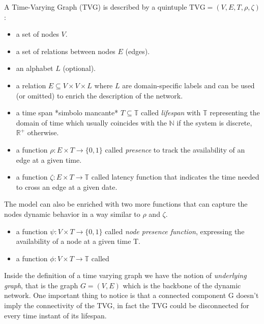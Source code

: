 	A Time-Varying Graph (TVG) is described by a quintuple \(\text{TVG} = (V, E, T, \rho, \zeta) \):
	\begin{itemize}
		\item a set of nodes \(V\).
		
		\item a set of relations between nodes \(E\) (edges).	
		
		\item an alphabet \(L\) (optional).
		
		\item a relation \(E \subseteq V \times V \times L\) where \(L\) are domain-specific labels and can be used (or omitted) to enrich the description of the network.
		
		\item a time span *simbolo mancante* \( T \subseteq \mathbb{T}\) called \textit{lifespan} with \(\mathbb{T}\) representing the domain of time which usually coincides with the \(\mathbb{N}\) if the system is discrete, \(\mathbb{R}^+\) otherwise.
		
		\item a function \(\rho : E \times T \to \{0, 1\} \) called \textit{presence} to track the availability of an edge at a given time.
		
		\item a function \(\zeta : E \times T \to \mathbb{T}\) called latency function that indicates the time needed to cross an edge at a given date.
	\end{itemize}

	The model can also be enriched with two more functions that can capture the nodes dynamic behavior in a way similar to \(\rho\) and \(\zeta\).
	\begin{itemize}
		\item a function \(\psi : V \times T \to \{0, 1\}\) called \textit{node presence function}, expressing the availability of a node at a given time T.
		
		\item a function \(\phi : V \times T \to \mathbb{T}\) called 
	\end{itemize}
	
	Inside the definition of a time varying graph we have the notion of \textit{underlying graph}, that is the graph \(G = (V, E)\) which is the backbone of the dynamic network. One important thing to notice is that a connected component G doesn't imply the connectivity of the TVG, in fact the TVG could be disconnected for every time instant of its lifespan.
	
